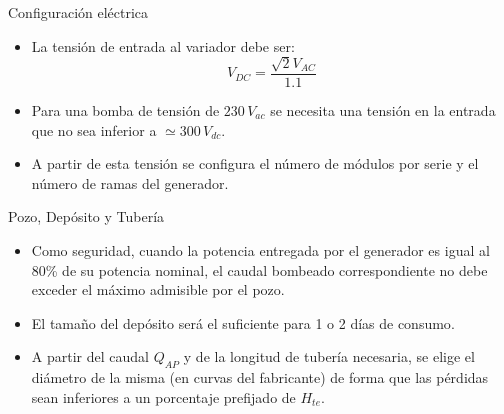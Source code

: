 \documentclass[xcolor={usenames,svgnames,dvipsnames}]{beamer}
\begin{document}
\begin{frame}[label={sec:org20fa84b}]{Configuración eléctrica}
\begin{itemize}
\item La \alert{tensión de entrada al variador} debe ser:$$V_{DC}=\frac{\sqrt{2}V_{AC}}{1.1}$$

\item Para una bomba de tensión de \(230\, V_{ac}\) se necesita una tensión en la entrada que no sea inferior a \(\simeq300\, V_{dc}\).

\item A partir de esta tensión se configura el \alert{número de módulos por serie} y el \alert{número de ramas} del generador.
\end{itemize}
\end{frame}

\begin{frame}[label={sec:orgbe00eed}]{Pozo, Depósito y Tubería}
\begin{itemize}
\item Como seguridad, cuando la potencia entregada por el generador es igual al 80\% de su potencia nominal, el caudal bombeado correspondiente no debe exceder el máximo admisible por el pozo.
\item El \alert{tamaño del depósito} será el suficiente para \alert{1 o 2 días de consumo}.
\item A partir del caudal \(Q_{AP}\) y de la longitud de tubería necesaria, se elige el \alert{diámetro} de la misma (en curvas del fabricante) de forma que las pérdidas sean inferiores a un porcentaje prefijado de \(H_{te}\).
\end{itemize}
\end{frame}
\end{document}
